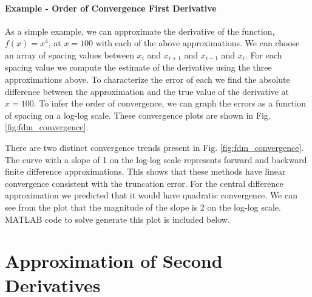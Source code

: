 \paragraph{Example - Order of Convergence First Derivative}
As a simple example, we can approximate the derivative of the function, $f\left(x\right) = x^{4}$, at $x=100$ with
each of the above approximations. We can choose an array of spacing values between $x_{i}$ and $x_{i+1}$ and $x_{i-1}$
and $x_{i}$. For each spacing value we compute the estimate of the derivative using the three approximations above.
To characterize the error of each we find the absolute difference between the approximation and the true value of the
derivative at $x=100$. To infer the order of convergence, we can graph the errors as a function of spacing on a 
log-log scale. These convergence plots are shown in Fig. \ref{fig:fdm_convergence}.
\par 
There are two distinct convergence trends present in Fig. \ref{fig:fdm_convergence}.  The curve with a slope of 1 on
the log-log scale represents forward and backward finite difference approximations. This shows that these methods
have linear convergence consistent with the truncation error. For the central difference approximation we predicted
that it would have quadratic convergence. We can see from the plot that the magnitude of the slope is 2 on the log-log scale.
MATLAB code to solve generate this plot is included below.


\section{Approximation of Second Derivatives}

